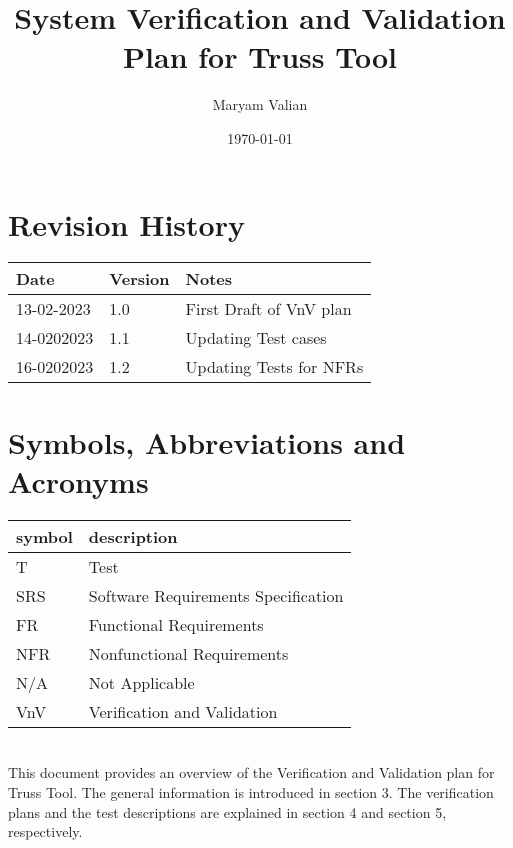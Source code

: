 \documentclass[12pt, titlepage]{article}
\begin{document}
\title{ System Verification and Validation Plan for Truss Tool} 
\author{Maryam Valian}
\date{\today}
	
\maketitle


\section{Revision History}

\begin{tabularx}{\textwidth}{p{3cm}p{2cm}X}
\toprule {\bf Date} & {\bf Version} & {\bf Notes}\\
\midrule
13-02-2023 & 1.0 & First Draft of VnV plan\\
14-0202023 & 1.1& Updating Test cases   \\
16-0202023 & 1.2& Updating Tests for NFRs   \\
\bottomrule
\end{tabularx}

\newpage

\tableofcontents

\newpage

\section{Symbols, Abbreviations and Acronyms}

\renewcommand{\arraystretch}{1.2}
\begin{tabular}{l l} 
  \toprule		
  \textbf{symbol} & \textbf{description}\\
  \midrule 
  T & Test\\
  SRS & Software Requirements Specification\\
  FR & Functional Requirements\\
  NFR & Nonfunctional Requirements\\
  N/A & Not Applicable\\
  VnV & Verification and Validation\\
  
\bottomrule
\end{tabular}\\


\newpage
This document provides an overview of the Verification and Validation
 plan for Truss Tool. The general information is introduced in section 3. The verification plans and the test descriptions are explained in section 4 and section 5, respectively.
\end{document}
